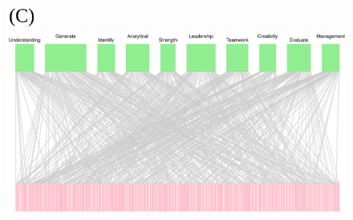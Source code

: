 \documentclass{article}
\begin{document}
\begin{figure}[htbp]
  \vspace{0.5cm}
  
  \begin{minipage}[b]{1\textwidth}
    \centering
\includegraphics[width=1cm]{(C).png}    \includegraphics[scale=0.4]{4C.pdf}
    \label{fig:figure3}
  \end{minipage}
  \label{fig:three_figures}
\end{figure}
\end{document}
